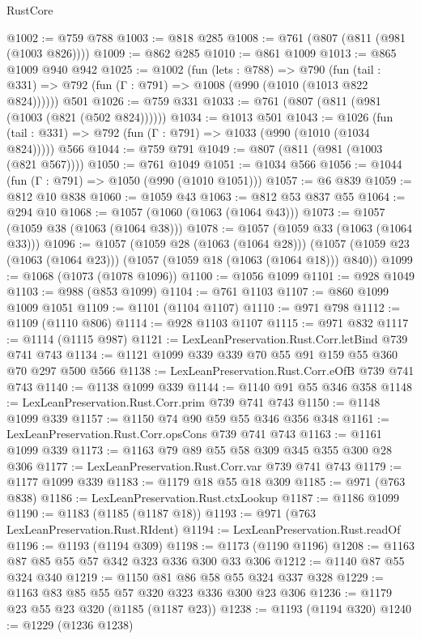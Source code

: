 \begin{lexlean}{RustCore}
\begin{coremodule}
@1002 := @759 @788
@1003 := @818 @285
@1008 := @761 (@807 (@811 (@981 (@1003 @826))))
@1009 := @862 @285
@1010 := @861 @1009
@1013 := @865 @1009 @940 @942
@1025 := @1002
    (fun (lets : @788) =>
    @790 (fun (tail : @331) => @792 (fun (Γ : @791) => @1008 (@990 (@1010 (@1013 @822 @824))))))
    @501
@1026 := @759 @331
@1033 := @761 (@807 (@811 (@981 (@1003 (@821 (@502 @824))))))
@1034 := @1013 @501
@1043 := @1026
    (fun (tail : @331) => @792 (fun (Γ : @791) => @1033 (@990 (@1010 (@1034 @824)))))
    @566
@1044 := @759 @791
@1049 := @807 (@811 (@981 (@1003 (@821 @567))))
@1050 := @761 @1049
@1051 := @1034 @566
@1056 := @1044 (fun (Γ : @791) => @1050 (@990 (@1010 @1051)))
@1057 := @6 @839
@1059 := @812 @10 @838
@1060 := @1059 @43
@1063 := @812 @53 @837 @55
@1064 := @294 @10
@1068 := @1057 (@1060 (@1063 (@1064 @43)))
@1073 := @1057 (@1059 @38 (@1063 (@1064 @38)))
@1078 := @1057 (@1059 @33 (@1063 (@1064 @33)))
@1096 := @1057
    (@1059 @28 (@1063 (@1064 @28)))
    (@1057 (@1059 @23 (@1063 (@1064 @23))) (@1057 (@1059 @18 (@1063 (@1064 @18))) @840))
@1099 := @1068 (@1073 (@1078 @1096))
@1100 := @1056 @1099
@1101 := @928 @1049
@1103 := @988 (@853 @1099)
@1104 := @761 @1103
@1107 := @860 @1099 @1009 @1051
@1109 := @1101 (@1104 @1107)
@1110 := @971 @798
@1112 := @1109 (@1110 @806)
@1114 := @928 @1103 @1107
@1115 := @971 @832
@1117 := @1114 (@1115 @987)
@1121 := LexLeanPreservation.Rust.Corr.letBind @739 @741 @743
@1134 := @1121 @1099 @339 @339 @70 @55 @91 @159 @55 @360 @70 @297 @500 @566
@1138 := LexLeanPreservation.Rust.Corr.eOfB @739 @741 @743
@1140 := @1138 @1099 @339
@1144 := @1140 @91 @55 @346 @358
@1148 := LexLeanPreservation.Rust.Corr.prim @739 @741 @743
@1150 := @1148 @1099 @339
@1157 := @1150 @74 @90 @59 @55 @346 @356 @348
@1161 := LexLeanPreservation.Rust.Corr.opsCons @739 @741 @743
@1163 := @1161 @1099 @339
@1173 := @1163 @79 @89 @55 @58 @309 @345 @355 @300 @28 @306
@1177 := LexLeanPreservation.Rust.Corr.var @739 @741 @743
@1179 := @1177 @1099 @339
@1183 := @1179 @18 @55 @18 @309
@1185 := @971 (@763 @838)
@1186 := LexLeanPreservation.Rust.ctxLookup
@1187 := @1186 @1099
@1190 := @1183 (@1185 (@1187 @18))
@1193 := @971 (@763 LexLeanPreservation.Rust.RIdent)
@1194 := LexLeanPreservation.Rust.readOf
@1196 := @1193 (@1194 @309)
@1198 := @1173 (@1190 @1196)
@1208 := @1163 @87 @85 @55 @57 @342 @323 @336 @300 @33 @306
@1212 := @1140 @87 @55 @324 @340
@1219 := @1150 @81 @86 @58 @55 @324 @337 @328
@1229 := @1163 @83 @85 @55 @57 @320 @323 @336 @300 @23 @306
@1236 := @1179 @23 @55 @23 @320 (@1185 (@1187 @23))
@1238 := @1193 (@1194 @320)
@1240 := @1229 (@1236 @1238)

\end{coremodule}
\end{lexlean}
